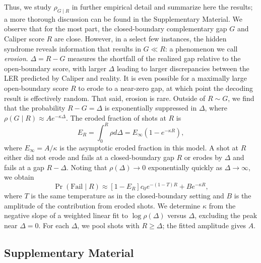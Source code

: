 \documentclass[
    reprint,
    amsmath,amssymb,
    nofootinbib,
    superscriptaddress,
    aps,
    noeprint,
    longbibliography,
    prl
]{revtex4-2}
\theoremstyle{plain}
\begin{document}
Thus, we study $\rho_{G \mid R}$ in further empirical detail and summarize here the results; a more
thorough discussion can be found in the Supplementary Material. We observe that for the most part,
the closed-boundary complementary gap $G$ and Caliper score $R$ are close. However, in a select few instances, the
hidden syndrome reveals information that results in $G \ll R$: a phenomenon we call
\textit{erosion}. $\Delta = R - G$ measures the shortfall of the realized gap relative to the open-boundary
score, with larger $\Delta$ leading to larger discrepancies between the LER predicted
by Caliper and reality. It is even possible for a maximally large open-boundary score $R$ to erode to
a near-zero gap, at which point the decoding result is effectively random. That said, erosion is
rare. Outside of $R \sim G$, we find that the probability $R - G = \Delta$ is exponentially
suppressed in $\Delta$, where $\rho(G \mid R) \approx A e^{-\kappa \Delta}$. The eroded fraction of
shots at $R$ is
\begin{equation}
    E_R = \int_{0}^{R} \rho d\Delta = E_\infty (1 - e^{-\kappa R}),
    \label{eq:erosion-fraction}
\end{equation}
where $E_\infty=A/\kappa$ is the asymptotic eroded fraction in this model.
A shot at $R$ either did not erode and fails at a closed-boundary gap $R$ or erodes by $\Delta$ and
fails at a gap $R - \Delta$. Noting that $\rho(\Delta) \rightarrow 0$ exponentially quickly as
$\Delta \rightarrow \infty$, we obtain
\begin{equation}
    \label{eq:phenomenological-description}
    \Pr(\text{Fail} \mid R) \approx [1 - E_R] c_0 e^{-(1-T)R} + B e^{-\kappa R},
\end{equation}
where $T$ is the same temperature as in the closed-boundary setting and $B$ is the amplitude of
the contribution from eroded shots. We determine $\kappa$ from
the negative slope of a weighted linear fit to $\log\rho(\Delta)$ versus $\Delta$, excluding the
peak near $\Delta=0$. For each $\Delta$, we pool shots with $R\geq\Delta$; the fitted amplitude
gives $A$.

\clearpage
\onecolumngrid
\subsection*{\Large Supplementary Material}
\normalsize

\let\addcontentsline\oldaddcontentsline
\end{document}
